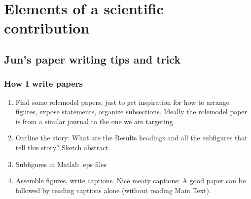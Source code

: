 \documentclass[letterpaper,10pt,english]{sphinxmanual}
\begin{document}
\sphinxstepscope


\chapter{Elements of a scientific contribution}
\label{\detokenize{02Elements:elements-of-a-scientific-contribution}}\label{\detokenize{02Elements::doc}}
\sphinxstepscope


\section{Jun’s paper writing tips and trick}
\label{\detokenize{PaperWritingTips:jun-s-paper-writing-tips-and-trick}}\label{\detokenize{PaperWritingTips:paperwritingtips}}\label{\detokenize{PaperWritingTips::doc}}

\subsection{How I write papers}
\label{\detokenize{PaperWritingTips:how-i-write-papers}}\begin{enumerate}
%
\setcounter{enumi}{-1}
\item {} 
\sphinxAtStartPar
Find some role\sphinxhyphen{}model papers, just to get inspiration for how to arrange figures, expose statements, organize subsections. Ideally the role\sphinxhyphen{}model paper is from a similar journal to the one we are targeting.

\item {} 
\sphinxAtStartPar
Outline the story: What are the Results headings and all the subfigures that tell this story? Sketch abstract.

\item {} 
\sphinxAtStartPar
Subfigures in Matlab .eps files

\item {} 
\sphinxAtStartPar
Assemble figures, write captions. Nice meaty captions: A good paper can be followed by reading captions alone (without reading Main Text).

\end{enumerate}
\end{document}
